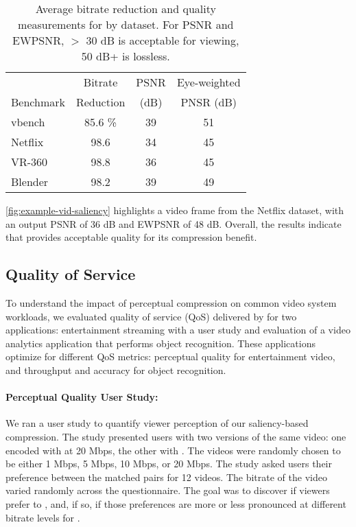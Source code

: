 \begin{table}[h]
  \caption{Average bitrate reduction and quality measurements for \nameCompress by dataset. For PSNR and EWPSNR, $>$ 30 dB is acceptable for viewing, 50 dB+ is lossless.}
  \label{table:dataset-quality}
  \centering
    \begin{tabular}{lccc}
      \toprule
       & Bitrate  & PSNR & Eye-weighted \\
      Benchmark & Reduction &   (dB) & PNSR (dB)  \\ \midrule
      vbench       &   85.6 \%     & 39       &   51                                    \\
      Netflix      & 98.6\phantom{ \%}       & 34        &  45                                 \\
      VR-360      & 98.8\phantom{ \%}        & 36        &  45                                \\
      Blender     & 98.2\phantom{ \%}        & 39        &  49               \\ \bottomrule
    \end{tabular}
\end{table}




\ref{fig:example-vid-saliency} highlights a \name video frame from the Netflix dataset, with an output PSNR of 36 dB and EWPSNR of 48 dB.
Overall, the results indicate that \nameCompress provides acceptable quality for its compression benefit.


\subsection{Quality of Service}
\label{subsec:qos}
To understand the impact of perceptual compression on common video system workloads, we evaluated quality of service (QoS) delivered by \name for two applications: entertainment streaming with a user study and evaluation of a video analytics application that performs object recognition.
These applications optimize for different QoS metrics: perceptual quality for entertainment video, and throughput and accuracy for object recognition.

\exampleVidSaliencyFigure

\paragraph{Perceptual Quality User Study:} We ran a user study to quantify viewer perception of our saliency-based compression.
The study presented users with two versions of the same video: one encoded with \hevc at 20 Mbps, the other with \nameCompress.
The \nameCompress videos were randomly chosen to be either 1 Mbps, 5 Mbps, 10 Mbps, or 20 Mbps.
The study asked users their preference between the matched pairs for 12 videos.
The bitrate of the \nameCompress video varied randomly across the questionnaire.
The goal was to discover if viewers prefer \nameCompress to \hevc, and, if so, if those preferences are more or less pronounced at different bitrate levels for \name.

